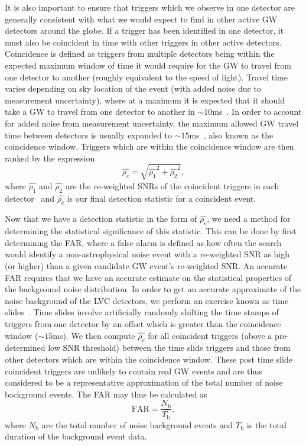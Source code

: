 %
%
It is also important to ensure that triggers which we observe in 
one detector are generally consistent with what we would expect to find in other active \ac{GW} detectors around the globe. If a trigger has been identified in one detector, it must also be coincident in time with other triggers in other active detectors. Coincidence is defined as triggers from multiple detectors being within the expected maximum window of time it would require for the \ac{GW} to travel from one detector to another (roughly equivalent to the speed of light). Travel time varies depending on sky location of the event (with added noise due to measurement uncertainty), where at a maximum it is expected that it should take a \ac{GW} to travel from one detector to another in $\sim 10$ms~\cite{0264-9381-33-21-215004}. In 
order to account for added noise from measurement uncertainty, the maximum allowed \ac{GW} travel time between detectors is usually expanded 
to $\sim 15$ms~\cite{0264-9381-33-21-215004}, also known as the coincidence window. Triggers which are within the coincidence window 
are then ranked by the expression 
\begin{equation}
    \hat{\rho_c} = \sqrt{\hat{\rho_1}^2 + \hat{\rho_2}^2},
\end{equation}
where $\hat{\rho_1}$ and $\hat{\rho_2}$ are the re-weighted \ac{SNR}s of 
the coincident triggers in each detector~\cite{0264-9381-33-21-215004} and 
$\hat{\rho_c}$ is our final detection statistic for a coincident event. 

%
% 
Now that we have a detection statistic in the form of $\hat{\rho_c}$, 
we need a method for determining the statistical significance of this statistic.
This can be done by first determining the \ac{FAR}, where a false alarm 
is defined as how often the search would identify a non-astrophysical 
noise event with a re-weighted \ac{SNR} as high (or higher) than a 
given candidate \ac{GW} event's 
re-weighted \ac{SNR}. An accurate \ac{FAR} requires that we have 
an accurate estimate on the statistical properties of the background 
noise distribution. In order to get an accurate 
approximate of the noise background of 
the \ac{LVC} detectors, we perform an exercise known as 
time slides~\cite{0264-9381-33-21-215004,2016arXiv160100130C}. Time 
slides involve artificially randomly shifting the time stamps of triggers from one detector by an offset which is greater than the coincidence window 
($\sim 15$ms). 
We then compute $\hat{\rho_c}$ for all coincident triggers (above a 
pre-determined low \ac{SNR} threshold) between the time slide triggers and those from other detectors which are within the coincidence window. These post time 
slide coincident triggers are unlikely to contain real \ac{GW} events 
and are thus considered to be a representative 
approximation of the total number of noise background events. The 
\ac{FAR} may thus be calculated as 
%
\begin{equation}
    \mathrm{FAR} = \frac{N_\mathrm{b}}{T_{\mathrm{b}}}, 
\end{equation}
%
where $N_\mathrm{b}$ are the total number of noise background events and
$T_{\mathrm{b}}$ is the total duration of the background event data. 

